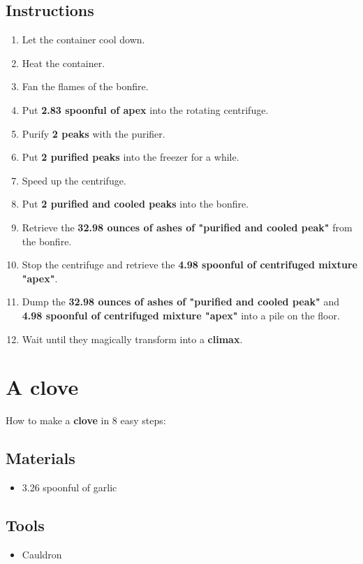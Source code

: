 \documentclass{article}
\begin{document}
\subsection{Instructions}\begin{enumerate}
\item 
Let the container cool down.
\item 
Heat the container.
\item 
Fan the flames of the bonfire.
\item 
Put \textbf{2.83 spoonful of apex} into the rotating centrifuge.
\item 
Purify \textbf{2 peaks} with the purifier.
\item 
Put \textbf{2 purified peaks} into the freezer for a while.
\item 
Speed up the centrifuge.
\item 
Put \textbf{2 purified and cooled peaks} into the bonfire.
\item 
Retrieve the \textbf{32.98 ounces of ashes of "purified and cooled peak"} from the bonfire.
\item 
Stop the centrifuge and retrieve the \textbf{4.98 spoonful of centrifuged mixture "apex"}.
\item 
Dump the \textbf{32.98 ounces of ashes of "purified and cooled peak"} and \textbf{4.98 spoonful of centrifuged mixture "apex"} into a pile on the floor.
\item 
Wait until they magically transform into a \textbf{climax}.
\end{enumerate}
\newpage
\section{A clove}How to make a \textbf{clove} in 8 easy steps:

\subsection{Materials}\begin{itemize}
\item 
3.26 spoonful of garlic
\end{itemize}
\subsection{Tools}\begin{itemize}
\item 
Cauldron
\end{itemize}
\end{document}

